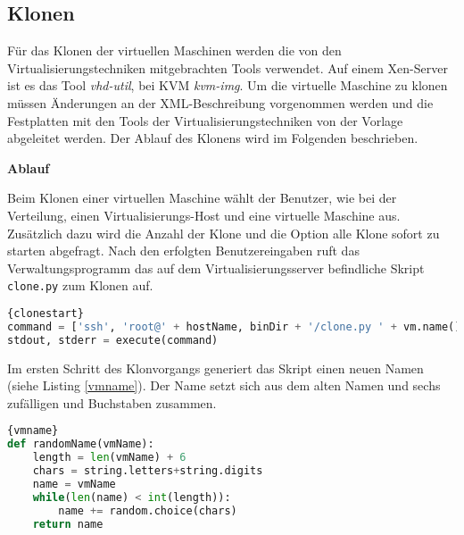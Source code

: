 \subsection{Klonen}
Für das Klonen der virtuellen Maschinen werden die von den Virtualisierungstechniken mitgebrachten Tools verwendet. Auf einem Xen-Server ist es das Tool \textit{vhd-util}, bei KVM \textit{kvm-img}. Um die virtuelle Maschine zu klonen müssen Änderungen an der XML-Beschreibung vorgenommen werden und die Festplatten mit den Tools der Virtualisierungstechniken von der Vorlage abgeleitet werden. Der Ablauf des Klonens wird im Folgenden beschrieben.  %

\textbf{Ablauf}

Beim Klonen einer virtuellen Maschine wählt der Benutzer, wie bei der Verteilung, einen Virtualisierungs-Host und eine virtuelle Maschine aus. Zusätzlich dazu wird die Anzahl der Klone und die Option alle Klone sofort zu starten abgefragt. Nach den erfolgten Benutzereingaben ruft das Verwaltungsprogramm das auf dem Virtualisierungsserver befindliche Skript \lstinline|clone.py| zum Klonen auf.
\\
\begin{lstlisting}[caption=Starten des Klonvorgangs (cow.py),language=Python,label=clonestart]{clonestart}
command = ['ssh', 'root@' + hostName, binDir + '/clone.py ' + vm.name() + ' ' + cloneCount + ' ' + autostart + ' ' + str(debug)]
stdout, stderr = execute(command)
\end{lstlisting}

Im ersten Schritt des Klonvorgangs generiert das Skript einen neuen Namen (siehe Listing \ref{vmname}). Der Name setzt sich aus dem alten Namen und sechs zufälligen und Buchstaben zusammen.
\\
\begin{lstlisting}[caption=Erstellen des Namens der VM (clone.py),language=Python, label=vmname]{vmname}
def randomName(vmName):
	length = len(vmName) + 6
	chars = string.letters+string.digits
	name = vmName
	while(len(name) < int(length)):
		name += random.choice(chars)
	return name
\end{lstlisting}

